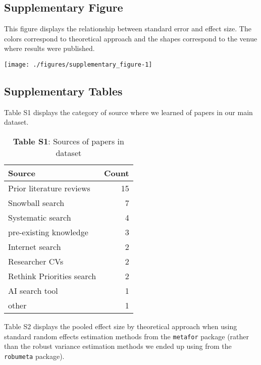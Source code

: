 \documentclass[sn-nature,pdflatex]{sn-jnl}
\begin{document}
\subsection{Supplementary Figure}\label{supplementary-figure}

This figure displays the relationship between standard error and effect
size. The colors correspond to theoretical approach and the shapes
correspond to the venue where results were published.

\texttt{[image: ./figures/supplementary\_figure-1]}

\subsection{Supplementary Tables}\label{supplementary-tables}

Table S1 displays the category of source where we learned of papers in
our main dataset. \captionsetup[table]{labelformat=empty}

\begin{table}[!h]
\centering
\caption{\label{tab:supp_table_one}\textbf{Table S1}: Sources of papers in dataset}
\centering
\begin{tabular}[t]{lr}
\toprule
Source & Count\\
\midrule
Prior literature reviews & 15\\
Snowball search & 7\\
Systematic search & 4\\
pre-existing knowledge & 3\\
Internet search & 2\\
\addlinespace
Researcher CVs & 2\\
Rethink Priorities search & 2\\
AI search tool & 1\\
other & 1\\
\bottomrule
\end{tabular}
\end{table}

Table S2 displays the pooled effect size by theoretical approach when
using standard random effects estimation methods from the
\texttt{metafor} package (rather than the robust variance estimation
methods we ended up using from the \texttt{robumeta} package).
\end{document}
